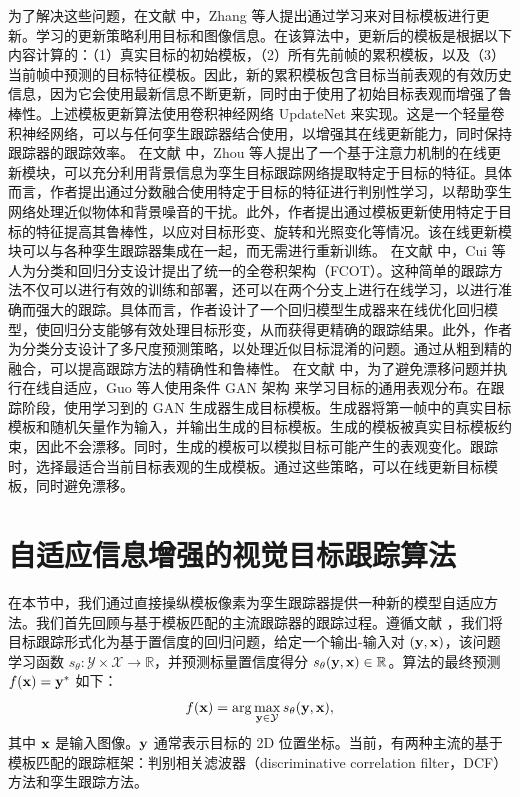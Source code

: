 为了解决这些问题，在文献 \cite{Zhang_2019_ICCV} 中，Zhang 等人提出通过学习来对目标模板进行更新。学习的更新策略利用目标和图像信息。在该算法中，更新后的模板是根据以下内容计算的：（1）真实目标的初始模板，（2）所有先前帧的累积模板，以及（3）当前帧中预测的目标特征模板。因此，新的累积模板包含目标当前表观的有效历史信息，因为它会使用最新信息不断更新，同时由于使用了初始目标表观而增强了鲁棒性。上述模板更新算法使用卷积神经网络 UpdateNet 来实现。这是一个轻量卷积神经网络，可以与任何孪生跟踪器结合使用，以增强其在线更新能力，同时保持跟踪器的跟踪效率。
在文献 \cite{DiscriminativeAnd} 中，Zhou 等人提出了一个基于注意力机制的在线更新模块，可以充分利用背景信息为孪生目标跟踪网络提取特定于目标的特征。具体而言，作者提出通过分数融合使用特定于目标的特征进行判别性学习，以帮助孪生网络处理近似物体和背景噪音的干扰。此外，作者提出通过模板更新使用特定于目标的特征提高其鲁棒性，以应对目标形变、旋转和光照变化等情况。该在线更新模块可以与各种孪生跟踪器集成在一起，而无需进行重新训练。%
在文献 \cite{FCOT} 中，Cui 等人为分类和回归分支设计提出了统一的全卷积架构（FCOT）。这种简单的跟踪方法不仅可以进行有效的训练和部署，还可以在两个分支上进行在线学习，以进行准确而强大的跟踪。具体而言，作者设计了一个回归模型生成器来在线优化回归模型，使回归分支能够有效处理目标形变，从而获得更精确的跟踪结果。此外，作者为分类分支设计了多尺度预测策略，以处理近似目标混淆的问题。通过从粗到精的融合，可以提高跟踪方法的精确性和鲁棒性。 %
在文献 \cite{TGGAN} 中，为了避免漂移问题并执行在线自适应，Guo 等人使用条件 GAN 架构 \cite{cGAN} 来学习目标的通用表观分布。在跟踪阶段，使用学习到的 GAN 生成器生成目标模板。生成器将第一帧中的真实目标模板和随机矢量作为输入，并输出生成的目标模板。生成的模板被真实目标模板约束，因此不会漂移。同时，生成的模板可以模拟目标可能产生的表观变化。跟踪时，选择最适合当前目标表观的生成模板。通过这些策略，可以在线更新目标模板，同时避免漂移。%

\section{自适应信息增强的视觉目标跟踪算法}
在本节中，我们通过直接操纵模板像素为孪生跟踪器提供一种新的模型自适应方法。我们首先回顾与基于模板匹配的主流跟踪器的跟踪过程。遵循文献 \cite{Danelljan_2020_CVPR}，我们将目标跟踪形式化为基于置信度的回归问题，给定一个输出-输入对 $(\textbf y,\textbf x)$，该问题学习函数 $s_\theta:\mathcal{Y\times X\rightarrow \mathbb R}$，并预测标量置信度得分 $s_\theta(\textbf y,\textbf x)\in\mathbb R$。算法的最终预测 $f(\textbf x)=\textbf y^*$ 如下：
\begin{equation}
    f(\textbf x) = \arg\max_{\textbf y\in \mathcal Y}s_\theta (\textbf y,\textbf x),
\end{equation}
其中 $\textbf x$ 是输入图像。$\textbf y$ 通常表示目标的 2D 位置坐标。当前，有两种主流的基于模板匹配的跟踪框架：判别相关滤波器（discriminative correlation filter，DCF）方法和孪生跟踪方法。

